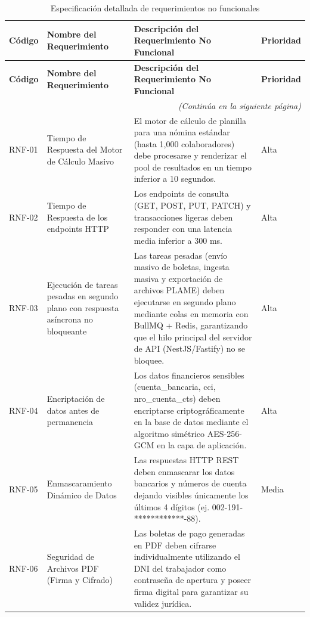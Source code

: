 \begin{longtable}{|l|p{4cm}|p{6cm}|l|}
    \caption{Especificación detallada de requerimientos no funcionales}
    \label{tab:anexo_especificacion_rnf} \\
    \hline
    \textbf{Código} & \textbf{Nombre del Requerimiento} & \textbf{Descripción del Requerimiento No Funcional} & \textbf{Prioridad} \\ \hline
    \endfirsthead
    \hline
    \textbf{Código} & \textbf{Nombre del Requerimiento} & \textbf{Descripción del Requerimiento No Funcional} & \textbf{Prioridad} \\ \hline
    \endhead
    \hline
    \multicolumn{4}{r}{\textit{(Continúa en la siguiente página)}} \\
    \endfoot
    \bottomrule
    \endlastfoot

    RNF-01 & 
    Tiempo de Respuesta del Motor de Cálculo Masivo & 
    El motor de cálculo de planilla para una nómina estándar (hasta 1,000 colaboradores) debe procesarse y renderizar el pool de resultados en un tiempo inferior a 10 segundos.
    & Alta \\ \hline
    RNF-02 & 
    Tiempo de Respuesta de los endpoints HTTP & 
    Los endpoints de consulta (GET, POST, PUT, PATCH) y transacciones ligeras deben responder con una latencia media inferior a 300 ms.
    & Alta \\ \hline
    RNF-03 & 
    Ejecución de tareas pesadas en segundo plano con respuesta asíncrona no bloqueante & 
    Las tareas pesadas (envío masivo de boletas, ingesta masiva y exportación de archivos PLAME) deben ejecutarse en segundo plano mediante colas en memoria con BullMQ + Redis, garantizando que el hilo principal del servidor de API (NestJS/Fastify) no se bloquee.
    & Alta \\ \hline
    RNF-04 & 
    Encriptación de datos antes de permanencia & 
    Los datos financieros sensibles (cuenta_bancaria, cci, nro_cuenta_cts) deben encriptarse criptográficamente en la base de datos mediante el algoritmo simétrico AES-256-GCM en la capa de aplicación.
    & Alta \\ \hline
    RNF-05 & 
    Enmascaramiento Dinámico de Datos & 
    Las respuestas HTTP REST deben enmascarar los datos bancarios y números de cuenta dejando visibles únicamente los últimos 4 dígitos (ej. 002-191-************-88).
    & Media \\ \hline
    RNF-06 & 
    Seguridad de Archivos PDF (Firma y Cifrado) & 
    Las boletas de pago generadas en PDF deben cifrarse individualmente utilizando el DNI del trabajador como contraseña de apertura y poseer firma digital para garantizar su validez jurídica.

\end{longtable}
